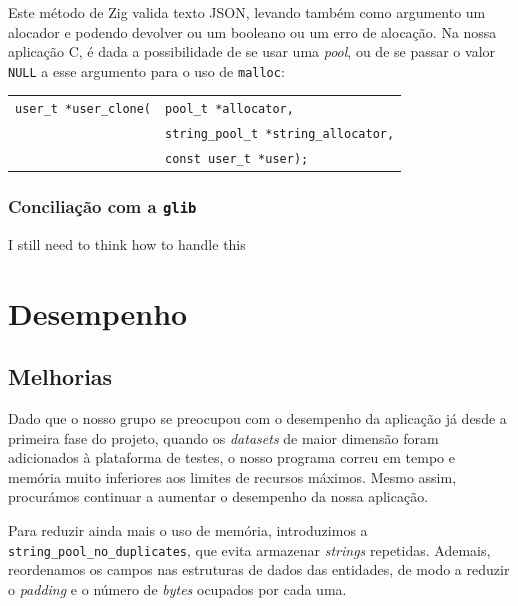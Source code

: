 \documentclass[12pt, a4paper]{article}
\begin{document}
Este método de Zig valida texto JSON, levando também como argumento um alocador e podendo devolver
ou um booleano ou um erro de alocação. Na nossa aplicação C, é dada a possibilidade de se usar uma
\emph{pool}, ou de se passar o valor \texttt{NULL} a esse argumento para o uso de \texttt{malloc}:

\begin{center}
    \begin{tabular}{rl}
		\texttt{user\_t *user\_clone(}&\hspace{-3mm}\texttt{pool\_t *allocator,} \\
        &\hspace{-3mm}\texttt{string\_pool\_t *string\_allocator,} \\
        &\hspace{-3mm}\texttt{const user\_t *user);}
    \end{tabular}
\end{center}

\subsubsection{Conciliação com a \texttt{glib}}
\label{sec:glib-conciliation}

{\color{red} I still need to think how to handle this}

\section{Desempenho}
\label{sec:performance}

\subsection{Melhorias}
\label{sec:performance-improvements}

Dado que o nosso grupo se preocupou com o desempenho da aplicação já desde a primeira fase do
projeto, quando os \emph{datasets} de maior dimensão foram adicionados à plataforma de testes,
o nosso programa correu em tempo e memória muito inferiores aos limites de recursos máximos. Mesmo
assim, procurámos continuar a aumentar o desempenho da nossa aplicação.

Para reduzir ainda mais o uso de memória, introduzimos a \texttt{string\_pool\_no\_duplicates}, que
evita armazenar \emph{strings} repetidas. Ademais, reordenamos os campos nas estruturas de dados das
entidades, de modo a reduzir o \emph{padding} e o número de \emph{bytes} ocupados por cada uma.
\end{document}
